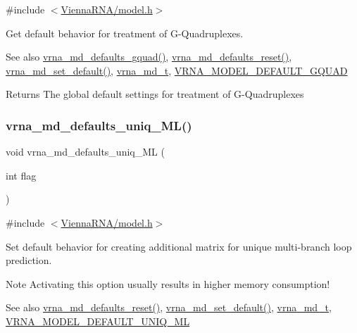 {\ttfamily \#include $<$\mbox{\hyperlink{model_8h}{Vienna\+R\+N\+A/model.\+h}}$>$}



Get default behavior for treatment of G-\/\+Quadruplexes. 

\begin{DoxySeeAlso}{See also}
\mbox{\hyperlink{group__model__details_ga0685ca2aeb39af76f2421fc308163dce}{vrna\+\_\+md\+\_\+defaults\+\_\+gquad()}}, \mbox{\hyperlink{group__model__details_ga70834424cf804d149937de89f80ceb45}{vrna\+\_\+md\+\_\+defaults\+\_\+reset()}}, \mbox{\hyperlink{group__model__details_ga8ac6ff84936282436f822644bf841f66}{vrna\+\_\+md\+\_\+set\+\_\+default()}}, \mbox{\hyperlink{group__model__details_ga1f8a10e12a0a1915f2a4eff0b28ea17c}{vrna\+\_\+md\+\_\+t}}, \mbox{\hyperlink{group__model__details_ga793ed812e86f43799b14b2deee917f23}{V\+R\+N\+A\+\_\+\+M\+O\+D\+E\+L\+\_\+\+D\+E\+F\+A\+U\+L\+T\+\_\+\+G\+Q\+U\+AD}} 
\end{DoxySeeAlso}
\begin{DoxyReturn}{Returns}
The global default settings for treatment of G-\/\+Quadruplexes 
\end{DoxyReturn}
\mbox{\label{group__model__details_ga59b944f61c5d2babec2d4c48c820de67}} 
\subsubsection{\texorpdfstring{vrna\_md\_defaults\_uniq\_ML()}{vrna\_md\_defaults\_uniq\_ML()}}
{\footnotesize\ttfamily void vrna\+\_\+md\+\_\+defaults\+\_\+uniq\+\_\+\+ML (\begin{DoxyParamCaption}\item[{int}]{flag }\end{DoxyParamCaption})}



{\ttfamily \#include $<$\mbox{\hyperlink{model_8h}{Vienna\+R\+N\+A/model.\+h}}$>$}



Set default behavior for creating additional matrix for unique multi-\/branch loop prediction. 

\begin{DoxyNote}{Note}
Activating this option usually results in higher memory consumption! 
\end{DoxyNote}
\begin{DoxySeeAlso}{See also}
\mbox{\hyperlink{group__model__details_ga70834424cf804d149937de89f80ceb45}{vrna\+\_\+md\+\_\+defaults\+\_\+reset()}}, \mbox{\hyperlink{group__model__details_ga8ac6ff84936282436f822644bf841f66}{vrna\+\_\+md\+\_\+set\+\_\+default()}}, \mbox{\hyperlink{group__model__details_ga1f8a10e12a0a1915f2a4eff0b28ea17c}{vrna\+\_\+md\+\_\+t}}, \mbox{\hyperlink{group__model__details_ga63f6006a02ba2d89148441f406c309e7}{V\+R\+N\+A\+\_\+\+M\+O\+D\+E\+L\+\_\+\+D\+E\+F\+A\+U\+L\+T\+\_\+\+U\+N\+I\+Q\+\_\+\+ML}} 
\end{DoxySeeAlso}

